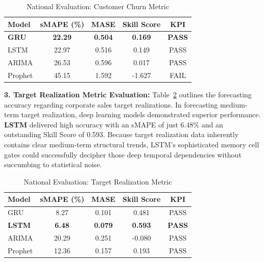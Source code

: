 \documentclass[conference]{IEEEtran}
\begin{document}
\begin{table}[htbp] \footnotesize
\caption{National Evaluation: Customer Churn Metric}
\begin{center}
\begin{tabular}{lcccc}
\toprule
\textbf{Model} & \textbf{sMAPE (\%)} & \textbf{MASE} & \textbf{Skill Score} & \textbf{KPI} \\
\midrule
\textbf{GRU} & \textbf{22.29} & \textbf{0.504} & \textbf{0.169} & \textbf{PASS} \\
LSTM & 22.97 & 0.516 & 0.149 & PASS \\
ARIMA & 26.53 & 0.596 & 0.017 & PASS \\
Prophet & 45.15 & 1.592 & -1.627 & FAIL \\
\bottomrule
\end{tabular}
\label{tab:fc_churn}
\end{center}

\end{table}
\vspace{-0.3cm}

\textbf{3. Target Realization Metric Evaluation:} Table~\ref{tab:fc_realisasi} outlines the forecasting accuracy regarding corporate sales target realizations. In forecasting medium-term target realization, deep learning models demonstrated superior performance. \textbf{LSTM} delivered high accuracy with an sMAPE of just 6.48\% and an outstanding Skill Score of 0.593. Because target realization data inherently contains clear medium-term structural trends, LSTM's sophisticated memory cell gates could successfully decipher those deep temporal dependencies without succumbing to statistical noise.

\begin{table}[htbp] \footnotesize
\caption{National Evaluation: Target Realization Metric}
\begin{center}
\begin{tabular}{lcccc}
\toprule
\textbf{Model} & \textbf{sMAPE (\%)} & \textbf{MASE} & \textbf{Skill Score} & \textbf{KPI} \\
\midrule
GRU & 8.27 & 0.101 & 0.481 & PASS \\
\textbf{LSTM} & \textbf{6.48} & \textbf{0.079} & \textbf{0.593} & \textbf{PASS} \\
ARIMA & 20.29 & 0.251 & -0.080 & PASS \\
Prophet & 12.36 & 0.157 & 0.193 & PASS \\
\bottomrule
\end{tabular}
\label{tab:fc_realisasi}
\end{center}

\end{table}
\vspace{-0.3cm}
\end{document}
